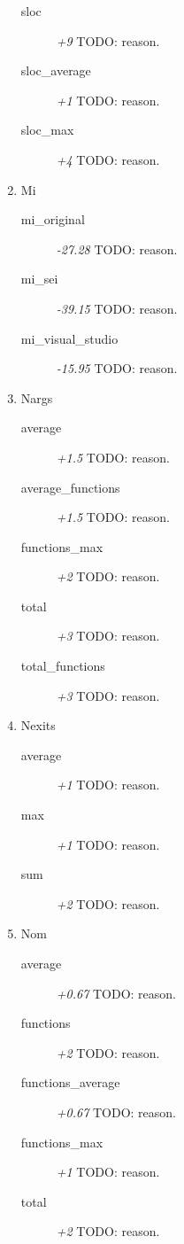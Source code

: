 \begin{enumerate}
\begin{description}
          \item [sloc] \textit{+9} TODO: reason.
          \item [sloc\_average] \textit{+1} TODO: reason.
          \item [sloc\_max] \textit{+4} TODO: reason.
        \end{description}
  \item Mi
        \begin{description}
          \item [mi\_original] \textit{-27.28} TODO: reason.
          \item [mi\_sei] \textit{-39.15} TODO: reason.
          \item [mi\_visual\_studio] \textit{-15.95} TODO: reason.
        \end{description}
  \item Nargs
        \begin{description}
          \item [average] \textit{+1.5} TODO: reason.
          \item [average\_functions] \textit{+1.5} TODO: reason.
          \item [functions\_max] \textit{+2} TODO: reason.
          \item [total] \textit{+3} TODO: reason.
          \item [total\_functions] \textit{+3} TODO: reason.
        \end{description}
  \item Nexits
        \begin{description}
          \item [average] \textit{+1} TODO: reason.
          \item [max] \textit{+1} TODO: reason.
          \item [sum] \textit{+2} TODO: reason.
        \end{description}
  \item Nom
        \begin{description}
          \item [average] \textit{+0.67} TODO: reason.
          \item [functions] \textit{+2} TODO: reason.
          \item [functions\_average] \textit{+0.67} TODO: reason.
          \item [functions\_max] \textit{+1} TODO: reason.
          \item [total] \textit{+2} TODO: reason.
        \end{description}
\end{enumerate}
